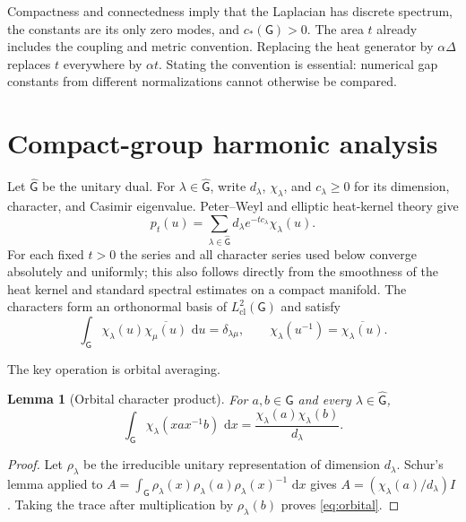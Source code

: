 \documentclass[11pt]{article}
\newtheorem{lemma}[theorem]{Lemma}
\theoremstyle{remark}
\newcommand{\G}{\mathsf G}
\newcommand{\dd}{\,\mathrm d}
\newcommand{\HclG}{L^2_{\mathrm{cl}}(\G)}
\begin{document}
Compactness and connectedness imply that the Laplacian has discrete spectrum,
the constants are its only zero modes, and $c_*(\G)>0$.  The area $t$ already
includes the coupling and metric convention.  Replacing
the heat generator by $\alpha\Delta$ replaces $t$ everywhere by $\alpha t$.
Stating the convention is essential: numerical gap constants from different
normalizations cannot otherwise be compared.

\section{Compact-group harmonic analysis}

Let $\widehat{\G}$ be the unitary dual.  For $\lambda\in\widehat{\G}$, write
$d_\lambda$, $\chi_\lambda$, and $c_\lambda\ge0$ for its dimension, character,
and Casimir eigenvalue.  Peter--Weyl and elliptic heat-kernel theory give
\begin{equation}\label{eq:full-heat}
 p_t(u)=\sum_{\lambda\in\widehat{\G}}
 d_\lambda e^{-tc_\lambda}\chi_\lambda(u).
\end{equation}
For each fixed $t>0$ the series and all character series used below converge
absolutely and uniformly; this also follows directly from the smoothness of
the heat kernel and standard spectral estimates on a compact manifold.  The
characters form an orthonormal basis of $\HclG$ and satisfy
\begin{equation}\label{eq:orth}
 \int_\G\chi_\lambda(u)\overline{\chi_\mu(u)}\,\dd u
 =\delta_{\lambda\mu},\qquad
 \chi_\lambda(u^{-1})=\overline{\chi_\lambda(u)}.
\end{equation}

The key operation is orbital averaging.

\begin{lemma}[Orbital character product]\label{lem:orbital}
For $a,b\in\G$ and every $\lambda\in\widehat{\G}$,
\begin{equation}\label{eq:orbital}
 \int_\G\chi_\lambda(xax^{-1}b)\,\dd x
 =\frac{\chi_\lambda(a)\chi_\lambda(b)}{d_\lambda}.
\end{equation}
\end{lemma}

\begin{proof}
Let $\rho_\lambda$ be the irreducible unitary representation of dimension
$d_\lambda$.
Schur's lemma applied to
$A=\int_\G\rho_\lambda(x)\rho_\lambda(a)\rho_\lambda(x)^{-1}\,\dd x$
gives $A=(\chi_\lambda(a)/d_\lambda)I$.  Taking the trace after multiplication
by $\rho_\lambda(b)$ proves \eqref{eq:orbital}.
\end{proof}
\end{document}
